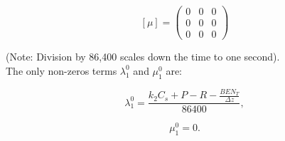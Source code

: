 $$
  [\mu] =
  \begin{pmatrix}
     0  & 0 & 0 \\
     0  & 0 & 0 \\
     0  & 0 & 0
  \end{pmatrix}
$$

(Note: Division by 86,400 scales down the time to one second).\\

The only non-zeros terms $ \lambda_1^0$ and $ \mu_1^0$ are:

\begin{equation}
  \lambda_1^0 = \frac{k_2 C_s + P - R - \frac{BEN_T}{\Delta z}}{86400},
\end{equation}

\begin{equation}
  \mu_1^0 = 0.
\end{equation}
